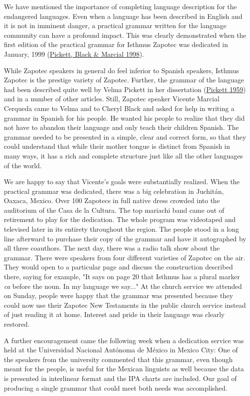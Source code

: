 \documentclass[12pt]{article}
\begin{document}
We have mentioned the importance of completing language description for the endangered languages. Even when a language has been described in English and it is not in imminent danger, a practical grammar written for the language community can have a profound impact. This was clearly demonstrated when the first edition of the practical grammar for Isthmus Zapotec was dedicated in January, 1999 (\hyperlink{rPickettBlackMarcial1st}{Pickett, Black \& Marcial  1998}).\par{}\indent While Zapotec speakers in general do feel inferior to Spanish speakers, Isthmus Zapotec is the prestige variety of Zapotec. Further, the grammar of the language had been described quite well by Velma Pickett in her dissertation (\hyperlink{rPickettDiss}{Pickett  1959}) and in a number of other articles. Still, Zapotec speaker Vicente Marcial Cerqueda came to Velma and to Cheryl Black and asked for help in writing a grammar in Spanish for his people. He wanted his people to realize that they did not have to abandon their language and only teach their children Spanish. The grammar needed to be presented in a simple, clear and correct form, so that they could understand that while their mother tongue is distinct from Spanish in many ways, it has a rich and complete structure just like all the other languages of the world.\par{}\indent We are happy to say that Vicente's goals were substantially realized. When the practical grammar was dedicated, there was a big celebration in Juchitán, Oaxaca, Mexico. Over 100 Zapotecs in full native dress crowded into the auditorium of the Casa de la Cultura. The top mariachi band came out of retirement to play for the dedication. The whole program was videotaped and televised later in its entirety throughout the region. The people stood in a long line afterward to purchase their copy of the grammar and have it autographed by all three coauthors. The next day, there was a radio talk show about the grammar. There were speakers from four different varieties of Zapotec on the air. They would open to a particular page and discuss the construction described there, saying for example, "It says on page 20 that Isthmus has a plural marker {\textit{ca}} before the noun. In my language we say..." At the church service we attended on Sunday, people were happy that the grammar was presented because they could now use their Zapotec New Testaments in the public church service instead of just reading it at home. Interest and pride in their language was clearly restored.\par{}\indent A further encouragement came the following week when a dedication service was held at the Universidad Nacional Autónoma de México in Mexico City: One of the speakers from the university commented that this grammar, even though meant for the people, is useful for the Mexican linguists as well because the data is presented in interlinear format and the IPA charts are included. Our goal of producing a single grammar that could meet both needs was accomplished.\par{}\vspace{.25in}\noindent\protect\hypertarget{sInterface}{{\noindent
}}
\end{document}
